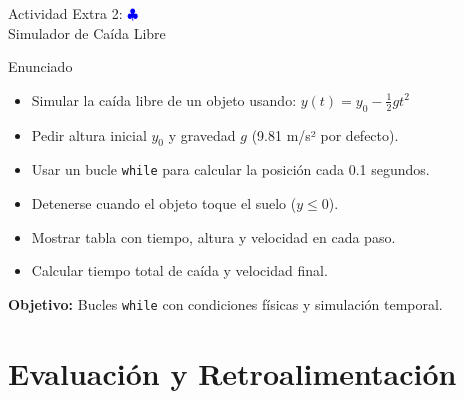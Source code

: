 \documentclass[10pt]{beamer}
\begin{document}
\begin{frame}{Actividad Extra 2: \hfill \textcolor{blue}{$\clubsuit$} \\ Simulador de Caída Libre}
  \begin{block}{Enunciado}
    \begin{itemize}
      \item Simular la caída libre de un objeto usando: \(y(t) = y_0 - \frac{1}{2}gt^2\)
      \item Pedir altura inicial \(y_0\) y gravedad \(g\) (9.81 m/s² por defecto).
      \item Usar un bucle \texttt{while} para calcular la posición cada 0.1 segundos.
      \item Detenerse cuando el objeto toque el suelo (\(y \leq 0\)).
      \item Mostrar tabla con tiempo, altura y velocidad en cada paso.
      \item Calcular tiempo total de caída y velocidad final.
    \end{itemize}
  \end{block}
  
  \textbf{Objetivo:} Bucles \texttt{while} con condiciones físicas y simulación temporal.
\end{frame}

\section{Evaluación y Retroalimentación}
\end{document}
